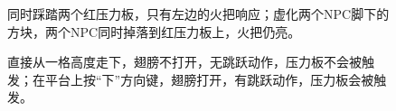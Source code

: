 \begin{figure}[!h]
\begin{center}
\qquad
{}
\end{center}
\caption{\protect{}同时踩踏两个红压力板，只有左边的火把响应；\protect{}虚化两个NPC脚下的方块，两个NPC同时掉落到红压力板上，火把仍亮。}
\label{i205:208}
\end{figure}

\begin{figure}[!h]
\begin{center}
\qquad
{}
\end{center}
\caption{\protect{}直接从一格高度走下，翅膀不打开，无跳跃动作，压力板不会被触发；\protect{}在平台上按“下”方向键，翅膀打开，有跳跃动作，压力板会被触发。}
\label{i201:202}
\end{figure}

